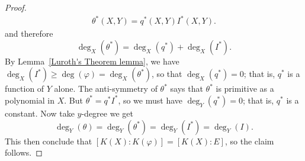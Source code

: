 \begin{proof}
\begin{align*}
\theta^*(X,Y)=q^*(X,Y)I^*(X,Y).
\end{align*}
and therefore
\[\deg_X(\theta^*)=\deg_X(q^*)+\deg_X(I^*).\]
By Lemma~\ref{Luroth's Theorem lemma}, we have $\deg_X(I^*)\geq\deg(\varphi)=\deg_X(\theta^*)$, so that $\deg_X(q^*)=0$; that is, $q^*$ is a function of $Y$ alone. The anti-symmetry of $\theta^*$ says that $\theta^*$ is primitive as a polynomial in $X$. But $\theta^*=q^*I^*$, so we must have $\deg_Y(q^*)=0$; that is, $q^*$ is a constant. Now take $y$-degree we get
\[\deg_Y(\theta)=\deg_Y(\theta^*)=\deg_Y(I^*)=\deg_Y(I).\]
This then conclude that $[K(X):K(\varphi)]=[K(X):E]$, so the claim follows.
\end{proof}